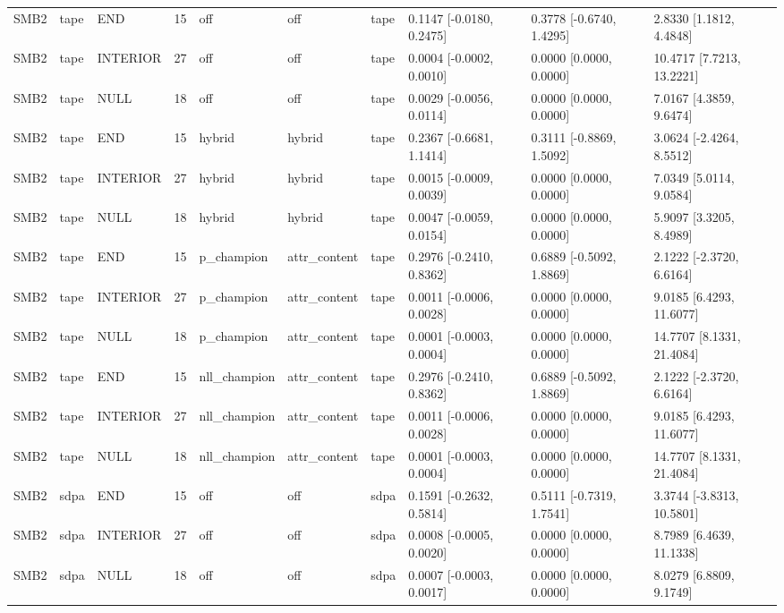 \begin{tabular}{llllllllll}
SMB2 & tape & END & 15 & off & off & tape & 0.1147 [-0.0180, 0.2475] & 0.3778 [-0.6740, 1.4295] & 2.8330 [1.1812, 4.4848] \\
SMB2 & tape & INTERIOR & 27 & off & off & tape & 0.0004 [-0.0002, 0.0010] & 0.0000 [0.0000, 0.0000] & 10.4717 [7.7213, 13.2221] \\
SMB2 & tape & NULL & 18 & off & off & tape & 0.0029 [-0.0056, 0.0114] & 0.0000 [0.0000, 0.0000] & 7.0167 [4.3859, 9.6474] \\
SMB2 & tape & END & 15 & hybrid & hybrid & tape & 0.2367 [-0.6681, 1.1414] & 0.3111 [-0.8869, 1.5092] & 3.0624 [-2.4264, 8.5512] \\
SMB2 & tape & INTERIOR & 27 & hybrid & hybrid & tape & 0.0015 [-0.0009, 0.0039] & 0.0000 [0.0000, 0.0000] & 7.0349 [5.0114, 9.0584] \\
SMB2 & tape & NULL & 18 & hybrid & hybrid & tape & 0.0047 [-0.0059, 0.0154] & 0.0000 [0.0000, 0.0000] & 5.9097 [3.3205, 8.4989] \\
SMB2 & tape & END & 15 & p\_champion & attr\_content & tape & 0.2976 [-0.2410, 0.8362] & 0.6889 [-0.5092, 1.8869] & 2.1222 [-2.3720, 6.6164] \\
SMB2 & tape & INTERIOR & 27 & p\_champion & attr\_content & tape & 0.0011 [-0.0006, 0.0028] & 0.0000 [0.0000, 0.0000] & 9.0185 [6.4293, 11.6077] \\
SMB2 & tape & NULL & 18 & p\_champion & attr\_content & tape & 0.0001 [-0.0003, 0.0004] & 0.0000 [0.0000, 0.0000] & 14.7707 [8.1331, 21.4084] \\
SMB2 & tape & END & 15 & nll\_champion & attr\_content & tape & 0.2976 [-0.2410, 0.8362] & 0.6889 [-0.5092, 1.8869] & 2.1222 [-2.3720, 6.6164] \\
SMB2 & tape & INTERIOR & 27 & nll\_champion & attr\_content & tape & 0.0011 [-0.0006, 0.0028] & 0.0000 [0.0000, 0.0000] & 9.0185 [6.4293, 11.6077] \\
SMB2 & tape & NULL & 18 & nll\_champion & attr\_content & tape & 0.0001 [-0.0003, 0.0004] & 0.0000 [0.0000, 0.0000] & 14.7707 [8.1331, 21.4084] \\
SMB2 & sdpa & END & 15 & off & off & sdpa & 0.1591 [-0.2632, 0.5814] & 0.5111 [-0.7319, 1.7541] & 3.3744 [-3.8313, 10.5801] \\
SMB2 & sdpa & INTERIOR & 27 & off & off & sdpa & 0.0008 [-0.0005, 0.0020] & 0.0000 [0.0000, 0.0000] & 8.7989 [6.4639, 11.1338] \\
SMB2 & sdpa & NULL & 18 & off & off & sdpa & 0.0007 [-0.0003, 0.0017] & 0.0000 [0.0000, 0.0000] & 8.0279 [6.8809, 9.1749] \\

\end{tabular}
